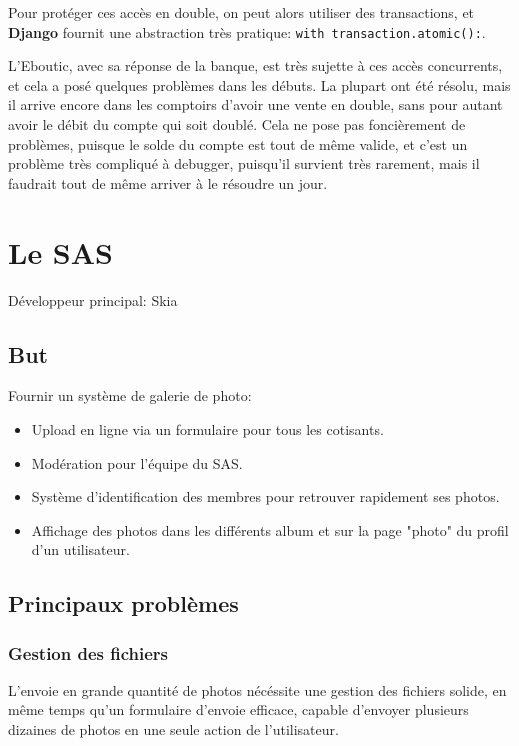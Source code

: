 \documentclass[a4paper]{report}
\begin{document}
\par Pour protéger ces accès en double, on peut alors utiliser des transactions, et \textbf{Django} fournit une
abstraction très pratique: \verb-with transaction.atomic():-.

\par L'Eboutic, avec sa réponse de la banque, est très sujette à ces accès concurrents, et cela a posé quelques
problèmes dans les débuts. La plupart ont été résolu, mais il arrive encore dans les comptoirs d'avoir une vente en
double, sans pour autant avoir le débit du compte qui soit doublé. Cela ne pose pas foncièrement de problèmes, puisque
le solde du compte est tout de même valide, et c'est un problème très compliqué à debugger, puisqu'il survient très
rarement, mais il faudrait tout de même arriver à le résoudre un jour.


\chapter{Le SAS}
\label{sec:le_sas}
\par Développeur principal: Skia

\section{But}
\label{sub:but}
\par Fournir un système de galerie de photo:
\begin{itemize}
    \item Upload en ligne via un formulaire pour tous les cotisants.
    \item Modération pour l'équipe du SAS.
    \item Système d'identification des membres pour retrouver rapidement ses photos.
    \item Affichage des photos dans les différents album et sur la page "photo" du profil d'un utilisateur.
\end{itemize}

\section{Principaux problèmes}
\label{sec:principaux_problemes}

\subsection{Gestion des fichiers}
\label{sub:gestion_des_fichiers}
\par L'envoie en grande quantité de photos nécéssite une gestion des fichiers solide, en même temps qu'un formulaire
d'envoie efficace, capable d'envoyer plusieurs dizaines de photos en une seule action de l'utilisateur.
\end{document}

